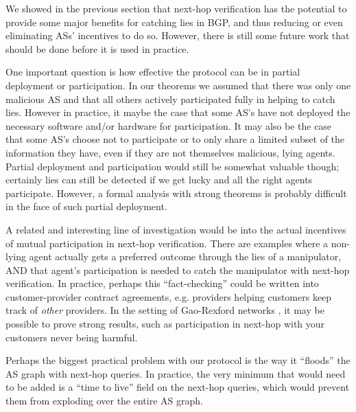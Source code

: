 \documentclass[10pt]{article}
\begin{document}

  We showed in the previous section that next-hop verification has the potential
  to provide some major benefits for catching lies in BGP, and thus reducing or
  even eliminating ASs' incentives to do so. However, there is still some future
  work that should be done before it is used in practice.

  One important question is how effective the protocol can be in partial
  deployment or participation. In our theorems we assumed that there was only
  one malicious AS and that all others actively participated fully in helping to
  catch lies. However in practice, it maybe the case that some AS's have not
  deployed the necessary software and/or hardware for participation. It may also
  be the case that some AS's choose not to participate or to only share a
  limited subset of the information they have, even if they are not themselves
  malicious, lying agents.
  Partial deployment and participation would still be somewhat valuable though;
  certainly lies can still be detected if we get lucky and all the right agents
  participate. However, a formal analysis with strong theorems is probably
  difficult in the face of such partial deployment.

  A related and interesting line of investigation would be into the
  actual incentives of mutual participation in next-hop verification.
  There are examples where a non-lying agent actually gets a preferred outcome
  through the lies of a manipulator, AND that agent's participation is needed to
  catch the manipulator with next-hop verification.
  In practice, perhaps this ``fact-checking'' could be written into
  customer-provider contract agreements,
  e.g. providers helping customers keep track of \emph{other} providers.
  In the setting of Gao-Rexford networks \cite{GaoRexford}, it may be possible
  to prove strong results, such as participation in next-hop with your customers
  never being harmful.

  Perhaps the biggest practical problem with our protocol
  is the way it ``floods'' the AS graph with next-hop queries.
  In practice, the very minimum that would need to be added is a
  ``time to live'' field on the next-hop queries,
  which would prevent them from exploding over the entire AS graph.
\end{document}
